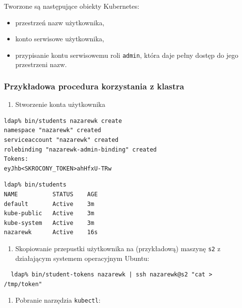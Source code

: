 \documentclass[a4paper,12pt,twoside,openany]{report}
\providecommand{\tightlist}{%
  \setlength{\itemsep}{0pt}\setlength{\parskip}{0pt}}
\newcommand{\passthrough}[1]{#1}
\begin{document}
Tworzone są następujące obiekty Kubernetes:

\begin{itemize}
\tightlist
\item
  przestrzeń nazw użytkownika,
\item
  konto serwisowe użytkownika,
\item
  przypisanie kontu serwisowemu roli \passthrough{\lstinline!admin!},
  która daje pełny dostęp do jego przestrzeni nazw.
\end{itemize}

\hypertarget{przykux142adowa-procedura-korzystania-z-klastra}{%
\subsubsection{Przykładowa procedura korzystania z
klastra}\label{przykux142adowa-procedura-korzystania-z-klastra}}

\begin{enumerate}
\def\labelenumi{\arabic{enumi}.}
\tightlist
\item
  Stworzenie konta użytkownika
\end{enumerate}

\begin{lstlisting}
ldap% bin/students nazarewk create
namespace "nazarewk" created
serviceaccount "nazarewk" created
rolebinding "nazarewk-admin-binding" created
Tokens:
eyJhb<SKROCONY_TOKEN>ahHfxU-TRw
\end{lstlisting}

\begin{lstlisting}
ldap% bin/students
NAME          STATUS    AGE
default       Active    3m
kube-public   Active    3m
kube-system   Active    3m
nazarewk      Active    16s
\end{lstlisting}

\begin{enumerate}
\def\labelenumi{\arabic{enumi}.}
\setcounter{enumi}{1}
\tightlist
\item
  Skopiowanie przepustki użytkownika na (przykładową) maszynę
  \passthrough{\lstinline!s2!} z działającym systemem operacyjnym
  Ubuntu:
\end{enumerate}

\begin{lstlisting}
  ldap% bin/student-tokens nazarewk | ssh nazarewk@s2 "cat > /tmp/token"
\end{lstlisting}

\begin{enumerate}
\def\labelenumi{\arabic{enumi}.}
\setcounter{enumi}{2}
\tightlist
\item
  Pobranie narzędzia \passthrough{\lstinline!kubectl!}:
\end{enumerate}
\end{document}
